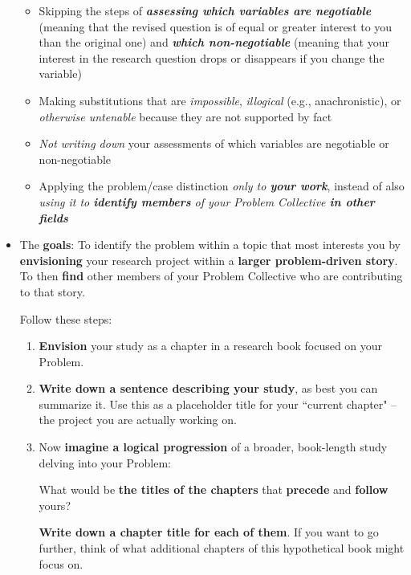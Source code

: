 \documentclass[11pt]{article}
\begin{document}
\begin{itemize}
\begin{itemize}
\item Skipping the steps of \emph{\textbf{assessing which variables are negotiable}} (meaning that the revised question is of equal or greater interest to you than the original one) and \emph{\textbf{which non-negotiable}} (meaning that your interest in the research question drops or disappears if you change the variable)

\item Making substitutions that are \emph{impossible}, \emph{illogical} (e.g., anachronistic), or \emph{otherwise untenable} because they are not supported by fact

\item \emph{Not writing down} your assessments of which variables are negotiable or non-negotiable

\item Applying the problem/case distinction \emph{only to \textbf{your work}}, instead of also \emph{using it to \textbf{identify members} of your Problem Collective \textbf{in other fields}}
\end{itemize}



\vspace{20pt}
\item  \begin{exercise}

The \textbf{goals}: To identify the problem within a topic that most interests you by \textbf{envisioning} your research project within a \textbf{larger problem-driven story}. To then \textbf{find} other members of your Problem Collective who are contributing to that story.

Follow these steps:
\begin{enumerate}
\item \textbf{Envision} your study as a chapter in a research book focused on your Problem.

\item \textbf{Write down a sentence describing your study}, as best you can summarize it.  Use this as a placeholder title for your ``current chapter" -- the project you are actually working on.

\item Now \textbf{imagine a logical progression} of a broader, book-length study delving into your Problem: 

What would be \textbf{the titles of the chapters} that \textbf{precede} and \textbf{follow} yours? 

\textbf{Write down a chapter title for each of them}. If you want to go further, think of what additional chapters of this hypothetical book might focus on.


\end{enumerate}
\end{exercise}
\end{itemize}
\end{document}
